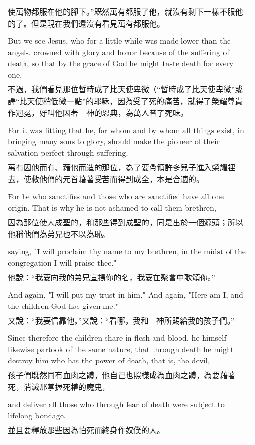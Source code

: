 \documentclass{book}
\begin{document}
\begin{tabularx}{\textwidth}{p{}}
使萬物都服在他的腳下。”既然萬有都服了他，就沒有剩下一樣不服他的了。但是現在我們還沒有看見萬有都服他。 \\ \\
But we see Jesus, who for a little while was made lower than the angels, crowned with glory and honor because of the suffering of death, so that by the grace of God he might taste death for every one. \\
不過，我們看見那位暫時成了比天使卑微（“暫時成了比天使卑微”或譯“比天使稍低微一點”的耶穌，因為受了死的痛苦，就得了榮耀尊貴作冠冕，好叫他因著　神的恩典，為萬人嘗了死味。 \\ \\
For it was fitting that he, for whom and by whom all things exist, in bringing many sons to glory, should make the pioneer of their salvation perfect through suffering. \\
萬有因他而有、藉他而造的那位，為了要帶領許多兒子進入榮耀裡去，使救他們的元首藉著受苦而得到成全，本是合適的。 \\ \\
For he who sanctifies and those who are sanctified have all one origin. That is why he is not ashamed to call them brethren, \\
因為那位使人成聖的，和那些得到成聖的，同是出於一個源頭；所以他稱他們為弟兄也不以為恥。 \\ \\
saying, "I will proclaim thy name to my brethren, in the midst of the congregation I will praise thee." \\
他說：“我要向我的弟兄宣揚你的名，我要在聚會中歌頌你。” \\ \\
And again, "I will put my trust in him." And again, "Here am I, and the children God has given me." \\
又說：“我要信靠他。”又說：“看哪，我和　神所賜給我的孩子們。” \\ \\
Since therefore the children share in flesh and blood, he himself likewise partook of the same nature, that through death he might destroy him who has the power of death, that is, the devil, \\
孩子們既然同有血肉之體，他自己也照樣成為血肉之體，為要藉著死，消滅那掌握死權的魔鬼， \\ \\
and deliver all those who through fear of death were subject to lifelong bondage. \\
並且要釋放那些因為怕死而終身作奴僕的人。 \\ \\

\end{tabularx}
\end{document}
